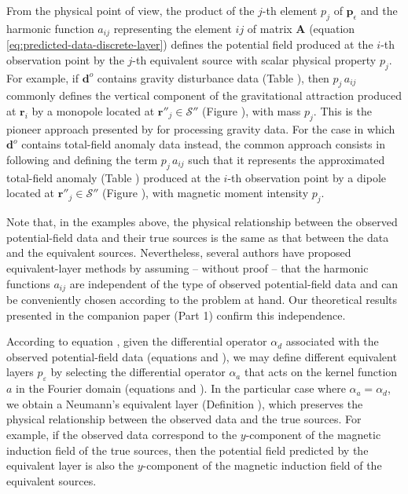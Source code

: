 From the physical point of view, the product of the $j$-th element $p_{j}$ of $\mathbf{p}_{\epsilon}$ 
and the harmonic function $a_{ij}$ representing the element $ij$ of matrix $\mathbf{A}$ 
(equation \ref{eq:predicted-data-discrete-layer}) defines the potential field produced at the $i$-th observation
point by the $j$-th equivalent source with scalar physical property $p_{j}$.
For example, if $\mathbf{d}^{o}$ contains gravity disturbance data
(Table ), then $p_{j} \, a_{ij}$ commonly defines the vertical component of the gravitational attraction
produced at $\mathbf{r}_{i}$ by a monopole located at
$\mathbf{r}''_{j} \in \mathcal{S}''$ (Figure ), with mass $p_{j}$. 
This is the pioneer approach presented by \cite{dampney1969} for 
processing gravity data.
For the case in which $\mathbf{d}^{o}$ contains total-field anomaly data 
\cite[e.g.,][ p. 178]{blakely1996} instead, the common approach consists in
following \cite{emilia1973} and defining the term $p_{j} \, a_{ij}$ such
that it represents the approximated total-field anomaly (Table ) 
produced at the $i$-th observation point by a dipole located at 
$\mathbf{r}''_{j} \in \mathcal{S}''$ (Figure ), with magnetic moment intensity $p_{j}$.

Note that, in the examples above, the physical relationship between the observed potential-field data and 
their true sources is the same as that between the data and the equivalent sources. Nevertheless, several 
authors \cite[e.g.,][]{cordell1992, guspi_novara2009, li_etal2014, soler_uieda2021} have proposed 
equivalent-layer methods by assuming -- without proof -- that the harmonic functions $a_{ij}$ are independent 
of the type of observed potential-field data and can be conveniently chosen according to the problem 
at hand. Our theoretical results presented in the companion paper (Part 1) confirm this independence.

According to equation , given the differential operator $\alpha_{d}$ 
associated with the observed potential-field data 
(equations  and ), we may define 
different equivalent layers $p_{\varepsilon}$ by selecting the differential operator $\alpha_{a}$ that 
acts on the kernel function $a$ in the Fourier domain 
(equations  and ). In the particular case 
where $\alpha_{a} = \alpha_{d}$, we obtain a Neumann's equivalent layer (Definition ), 
which preserves the physical relationship between the observed data and the true sources. For example, if 
the observed data correspond to the $y$-component of the magnetic induction field of the true sources, 
then the potential field predicted by the equivalent layer is also the $y$-component of the magnetic induction field of 
the equivalent sources.


